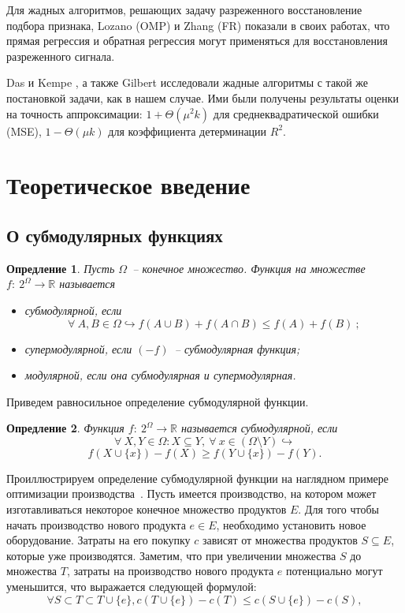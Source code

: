 \documentclass[preprint,12pt]{elsarticle}
\newtheorem{definition}{Опредление}
\begin{document}
Для жадных алгоритмов, решающих задачу разреженного восстановление подбора признака, Lozano \cite{swirszcz2009grouped} (OMP) и Zhang \cite{zhang2009consistency} (FR) показали в своих работах, что прямая регрессия и обратная регрессия могут применяться для восстановления разреженного сигнала. 

Das и Kempe \cite{das2011submodular}, а также Gilbert \cite{gilbert2003approximation} исследовали жадные алгоритмы с такой же постановкой задачи, как в нашем случае. Ими были получены результаты оценки на точность аппроксимации: $1+\Theta\left(\mu^{2} k\right)$ для среднеквадратической ошибки (MSE), $1-\Theta(\mu k)$ для коэффициента детерминации $R^2$.












\section{Теоретическое введение}
\label{sec:theory}
\subsection{О субмодулярных функциях}

\begin{definition}
Пусть $\Omega$~-- конечное множество. Функция на множестве $f:~2^\Omega \rightarrow \mathbb{R}$ называется
\begin{itemize}
    \item субмодулярной, если
    \[\forall~A,B\in \Omega \hookrightarrow f(A \cup B) + f(A\cap B) \leqslant f(A)+f(B)~;\]
    \item супермодулярной, если $(-f)$~-- субмодулярная функция;
    \item модулярной, если она субмодулярная и супермодулярная.
\end{itemize}
\end{definition}
Приведем равносильное определение субмодулярной функции.
\begin{definition}
\label{subm}
Функция $f:~2^\Omega\rightarrow \mathbb{R}$ называется субмодулярной, если
\[\forall~X, Y \in \Omega: X\subseteq Y,~\forall~x \in (\Omega \setminus Y) \hookrightarrow\] \[ f(X\cup \{x\})-f(X)\geqslant f(Y\cup\{x\})-f(Y).\]
\end{definition}

Проиллюстрируем определение субмодулярной функции на наглядном примере оптимизации производства~\cite{mccormick2005submodular}. Пусть имеется производство, на котором может изготавливаться некоторое конечное множество продуктов $E$. Для того чтобы начать производство нового продукта $e \in E$, необходимо установить новое оборудование. Затраты на его покупку $c$ зависят от множества продуктов $S \subseteq E$, которые уже производятся. Заметим, что при увеличении множества $S$ до множества $T$, затраты на производство нового продукта $e$ потенциально могут уменьшится, что выражается следующей формулой:
\[\forall S \subset T \subset T \cup \{e\}, c(T\cup \{e\}) - c(T) \leq c(S \cup \{e\}) - c(S),\]
\end{document}
